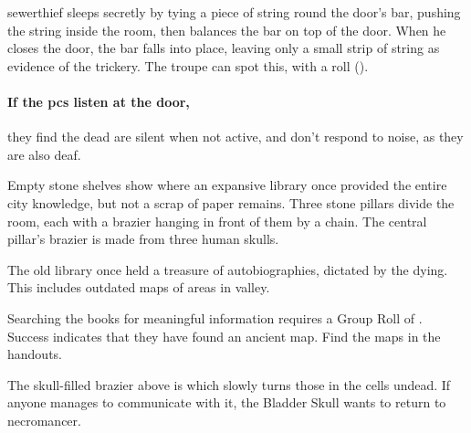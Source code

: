 \Gls{sewerthief} sleeps secretly by tying a piece of string round the door's bar, pushing the string inside the room, then balances the bar on top of the door.
When he closes the door, the bar falls into place, leaving only a small strip of string as evidence of the trickery.
The troupe can spot this, with a  roll (\tn[13]).

\paragraph{If the \glspl{pc} listen at the door,}
they find the dead are silent when not active, and don't respond to noise, as they are also deaf.%


\begin{boxtext}

  Empty stone shelves show where an expansive library once provided the entire city knowledge, but not a scrap of paper remains.
  Three stone pillars divide the room, each with a brazier hanging in front of them by a chain.
  The central pillar's brazier is made from three human skulls.

\end{boxtext}


\begin{exampletext}
  The old library once held a treasure of autobiographies, dictated by the dying.
  This includes outdated maps of areas in \gls{valley}.
\end{exampletext}

\noindent
Searching the books for meaningful information requires a Group Roll of .
Success indicates that they have found an ancient map.
Find the maps in the handouts.

The skull-filled brazier above is  which slowly turns those in the cells undead.
If anyone manages to communicate with it, the Bladder Skull wants to return to \gls{necromancer}.

